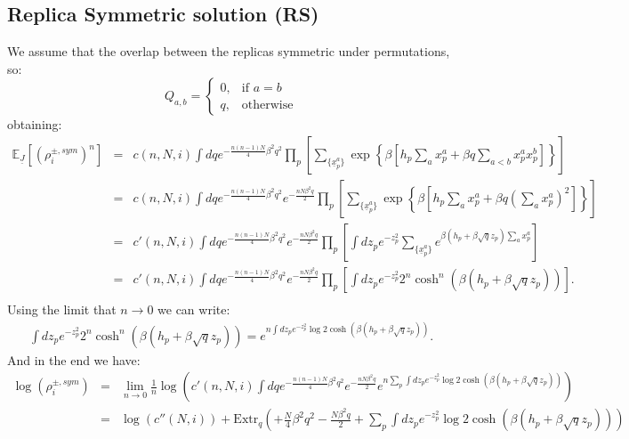 \documentclass{article}
\begin{document}
\subsection{Replica Symmetric solution (RS)}
We assume that the overlap between the replicas symmetric under permutations, so:
$$
Q_{a,b}=\begin{cases}
			0, & \text{if $a=b$}\\
            q, & \text{otherwise}
		 \end{cases}
$$
obtaining:
\begin{eqnarray}
\mathbb{E}_{\underline{J}}\left[(\rho_i^{\pm, sym})^n \right] & = & 
c(n,N,i)
\int dq e^{-\frac{n(n-1)N}{4}\beta^2 q^2}
\prod_{p} \left[
\sum_{\{\underline{x}^{a}_p\}} 
\exp\left\{\beta \left[
h_p \sum_{a} x_p^{a} +\beta q \sum_{a<b} x_p^{a} x_p^{b} \right]  \right\} 
\right] \\
& = &
c(n,N,i)
\int dq e^{-\frac{n(n-1)N}{4}\beta^2 q^2}
e^{-\frac{nN\beta^2 q}{2}}
\prod_{p} \left[
\sum_{\{\underline{x}^{a}_p\}} 
\exp\left\{\beta \left[
h_p \sum_{a} x_p^{a} +\beta q \left(\sum_{a} x_p^{a} \right)^2 \right] \right\} 
\right]\\
& = &
c'(n,N,i)
\int dq e^{-\frac{n(n-1)N}{4}\beta^2 q^2}
e^{-\frac{nN\beta^2 q}{2}}
\prod_{p} \left[\int dz_p e^{-z_p^2}
\sum_{\{\underline{x}^{a}_p\}} 
e^{\beta \left(
h_p +\beta \sqrt{q}z_p \right) \sum_{a} x_p^{a}} 
\right]\\
& = &
c'(n,N,i)
\int dq e^{-\frac{n(n-1)N}{4}\beta^2 q^2}
e^{-\frac{nN\beta^2 q}{2}}
\prod_{p} \left[\int dz_p e^{-z_p^2}
2^n\cosh^n \left(\beta \left(
h_p +\beta \sqrt{q}z_p \right)\right) 
\right].\\
\end{eqnarray}
Using the limit that $n\rightarrow 0$ we can write:
\begin{eqnarray}
\int dz_p e^{-z_p^2}
2^n\cosh^n \left(\beta \left(
h_p +\beta \sqrt{q}z_p \right)\right) = e^{n \int dz_p e^{-z_p^2}
\log 2\cosh \left(\beta \left(
h_p +\beta \sqrt{q}z_p \right)\right)}.
\label{eq:gauss_n0}
\end{eqnarray}
And in the end we have:
\begin{eqnarray}
\log (\rho_i^{\pm, sym}) & = & 
\lim_{n\rightarrow 0} \frac{1}{n} \log \left( c'(n,N,i)
\int dq e^{-\frac{n(n-1)N}{4}\beta^2 q^2}
e^{-\frac{nN\beta^2 q}{2}}
e^{n \sum_p 
\int dz_p e^{-z_p^2}
\log 2\cosh \left(\beta \left(
h_p +\beta \sqrt{q}z_p \right)\right)
} 
\right)\\
& = &
\log(c''(N,i)) + 
\text{Extr}_q \left( +\frac{N}{4}\beta^2 q^2 
-\frac{N\beta^2 q}{2}
+ \sum_p 
\int dz_p e^{-z_p^2}
\log 2\cosh \left(\beta \left(
h_p +\beta \sqrt{q}z_p \right)\right)
\right) \\
\end{eqnarray}
\end{document}
